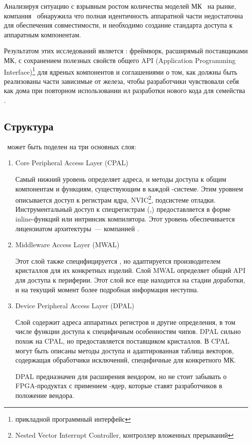 \bigskip
Анализируя ситуацию с взрывным ростом количества моделей МК \ на рынке,
компания \arm\ обнаружила что полная идентичность аппаратной части недостаточна
для обеспечения совместимости, и необходимо создание стандарта доступа к
аппаратным компонентам.

Результатом этих исследований является \cmsis: фреймворк, расширямый
поставщиками МК, с сохранением полезных свойств общего API (Application Programming
Interface)\footnote{прикладной программный интерфейс} для ядреных компонентов и
соглашениями о том, как должны быть реализованы части зависимые от железа, чтобы
разработчики чувствовали себя как дома при повторном использовании ил разработки
нового кода для семейства \cm{}.

\subsection{Структура \cmsis}

\cmsis\ может быть поделен на три основных слоя:

\begin{enumerate}
\item Core Peripheral Access Layer (CPAL)

Самый нижний уровень определяет адреса, и методы доступа к общим компонентам и
функциям, существующим в каждой \cm{}-системе. Этим уровнем
описывается доступ к регистрам ядра, NVIC\footnote{Nested Vector Interrupt
Controller, контроллер вложенных прерываний}, подсистеме отладки.
Инструментальный доступ к спецрегистрам (,)
предоставляется в форме inline-функций или интринсик компилятора. Этот уровень
обеспечивается лицензиатом архитектуры\ --- компанией \arm.

\item Middleware Access Layer (MWAL)

Этот слой также специфицируется \arm, но адаптируется производителем кристаллов
для их конкретных изделий. Слой MWAL определяет общий API для доступа к
периферии. Этот слой все еще находится на стадии доработки, и на текущий момент
более подробная информация неступна.

\item Device Peripheral Access Layer (DPAL)

Слой содержит адреса аппаратных регистров и другие определения, в том числе
функции доступа к специфичным особенностям чипов.
DPAL сильно похож на CPAL, но предоставляется поставщиком кристаллов.
В CPAL могут быть описаны методы доступа и адаптированная таблица векторов,
содержащая обработчики исключений, специфичные для конкретного МК.

DPAL предназначен для расширения вендором, но не стоит забывать о
FPGA-продуктах с примением \cm{}-ядер, которые ставят разработчиков в положение
вендора.

\end{enumerate} 

